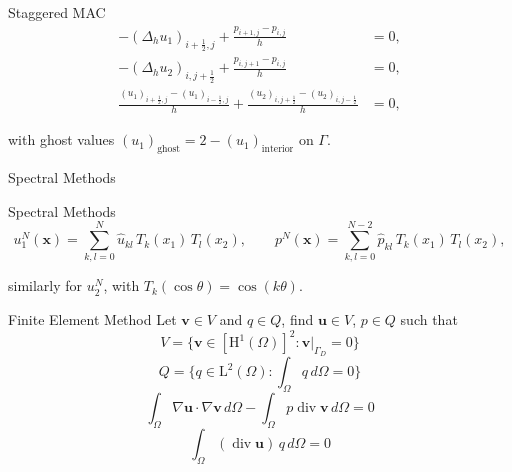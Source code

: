 \documentclass[aspectratio=169]{beamer}
\begin{document}
\begin{frame}{\Large Staggered MAC}
  \Large
\[
\begin{aligned}
  -(\Delta_h u_1)_{i+\frac12,j} + \frac{p_{i+1,j}-p_{i,j}}{h} &= 0, \\
  -(\Delta_h u_2)_{i,j+\frac12} + \frac{p_{i,j+1}-p_{i,j}}{h} &= 0, \\
  \frac{(u_1)_{i+\frac12,j}-(u_1)_{i-\frac12,j}}{h} + \frac{(u_2)_{i,j+\frac12}-(u_2)_{i,j-\frac12}}{h} &= 0,
\end{aligned}
\]
\begin{center}
  with ghost values $(u_1)_{\text{ghost}} = 2 - (u_1)_{\text{interior}}$ on $\Gamma$.
\end{center}
\end{frame}

\begin{frame}{\Large Spectral Methods}
  \centering
{}
\end{frame}

\begin{frame}{\Large Spectral Methods}
  \Large
\[
  u_{1}^N(\mathbf{x}) = \sum_{k,l=0}^{N} \hat u_{kl}\,T_k(x_1)\,T_l(x_2),
  \qquad
  p^N(\mathbf{x}) = \sum_{k,l=0}^{N-2} \hat p_{kl}\,T_k(x_1)\,T_l(x_2),
\]
\begin{center}
  similarly for $u_2^N$, with $T_k(\cos\theta) = \cos(k\theta)$.
\end{center}
\end{frame}

\begin{frame}{\Large Finite Element Method}
  \Large
  Let $\mathbf{v} \in V$ and $q \in Q$, find $\mathbf{u} \in V$, $p \in Q$ such that
  \begin{equation*}
    V = \{ \mathbf{v} \in \left[ \mathrm{H}^1 (\Omega) \right]^2 : \mathbf{v} \vert_{\varGamma_D} = 0 \}
  \end{equation*}
  \begin{equation*}
    Q = \{q \in \mathrm{L}^2 (\Omega) : \int_{\Omega} q \, d\Omega = 0 \}
  \end{equation*}
  \begin{equation*}
    \int_{\Omega} \nabla \mathbf{u} \cdot \nabla \mathbf{v} \, d\Omega 
    -\int_{\Omega} p \operatorname{div} \mathbf{v} \, d\Omega 
    = 0
  \end{equation*}
  \begin{equation*}
    \int_{\Omega} (\operatorname{div} \mathbf{u}) \, q \, d\Omega = 0
  \end{equation*}
\end{frame}
\end{document}
